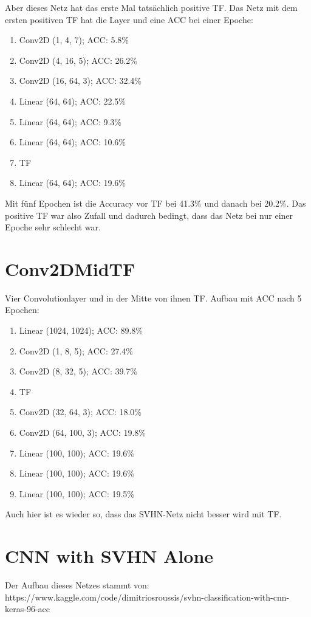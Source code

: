     Aber dieses Netz hat das erste Mal tatsächlich positive TF. Das Netz mit dem ersten 
    positiven TF hat die Layer und eine ACC bei einer Epoche: 
    \begin{enumerate}
        \item Conv2D (1, 4, 7); ACC: 5.8\%
        \item Conv2D (4, 16, 5); ACC: 26.2\%
        \item Conv2D (16, 64, 3); ACC: 32.4\%
        \item Linear (64, 64); ACC: 22.5\%
        \item Linear (64, 64); ACC: 9.3\%
        \item Linear (64, 64); ACC: 10.6\%
        \item TF
        \item Linear (64, 64); ACC: 19.6\%
    \end{enumerate}

    Mit fünf Epochen ist die Accuracy vor TF bei 41.3\% und danach bei 20.2\%. 
    Das positive TF war also Zufall und dadurch bedingt, dass das Netz bei nur einer 
    Epoche sehr schlecht war.

\section{Conv2DMidTF}
    Vier Convolutionlayer und in der Mitte von ihnen TF.
    Aufbau mit ACC nach 5 Epochen: 
    \begin{enumerate}
        \item Linear (1024, 1024); ACC: 89.8\%
        \item Conv2D (1, 8, 5); ACC: 27.4\%
        \item Conv2D (8, 32, 5); ACC: 39.7\%
        \item TF
        \item Conv2D (32, 64, 3); ACC: 18.0\%
        \item Conv2D (64, 100, 3); ACC: 19.8\%
        \item Linear (100, 100); ACC: 19.6\%
        \item Linear (100, 100); ACC: 19.6\%
        \item Linear (100, 100); ACC: 19.5\%
    \end{enumerate}
    Auch hier ist es wieder so, dass das SVHN-Netz nicht besser wird mit TF.

\section{CNN with SVHN Alone}
    Der Aufbau dieses Netzes stammt von: https://www.kaggle.com/code/dimitriosroussis/svhn-classification-with-cnn-keras-96-acc
    
